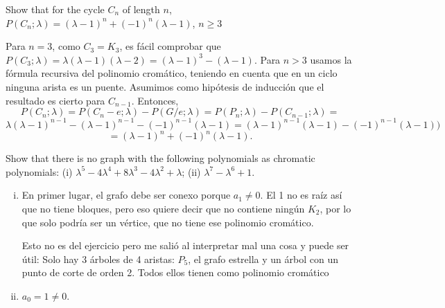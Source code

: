 \documentclass[twoside]{article}
\begin{document}
\newpage

\begin{ejercicio}{3.6}
Show that for the cycle $C_n$ of length $n$, $P(C_n; λ) = (λ − 1)^n + (−1)^n
(λ − 1)$, $n ≥ 3$
\end{ejercicio}
\begin{solucion}
Para $n=3$, como $C_3=K_3$, es fácil comprobar que $P(C_3;\lambda)=\lambda(\lambda-1)(\lambda-2)=(λ − 1)^3 −(λ − 1)$. Para $n>3$ usamos la fórmula recursiva del polinomio cromático, teniendo en cuenta que en un ciclo ninguna arista es un puente. Asumimos como hipótesis de inducción que el resultado es cierto para $C_{n-1}$. Entonces, 
\[
P(C_n;\lambda)=P(C_n-e;\lambda)-P(G/e;\lambda)=P(P_n;\lambda)-P(C_{n-1};\lambda)=
\]
\[
\lambda(\lambda-1)^{n-1}-(λ − 1)^{n-1} - (−1)^{n-1}(λ − 1)=(λ − 1)^{n-1}(\lambda-1)-(−1)^{n-1}(λ − 1))
\]
\[
=(λ − 1)^n+(−1)^n(λ − 1).
\]


%
\end{solucion}

\newpage

\begin{ejercicio}{3.7}
Show that there is no graph with the following polynomials as chromatic polynomials:
(i) $λ^5 − 4λ^4 + 8λ^3 − 4λ^2 + λ$; (ii) $λ^7 − λ^6 + 1$.
\end{ejercicio}
\begin{solucion}
\begin{enumerate}[(i)]
\item En primer lugar, el grafo debe ser conexo porque $a_1\neq 0$. El 1 no es raíz así que no tiene bloques, pero eso quiere decir que no contiene ningún $K_2$, por lo que solo podría ser un vértice, que no tiene ese polinomio cromático. 

Esto no es del ejercicio pero me salió al interpretar mal una cosa y puede ser útil: Solo hay 3 árboles de 4 aristas: $P_5$, el grafo estrella y un árbol con un punto de corte de orden 2. Todos ellos tienen como polinomio cromático
\item $a_0=1\neq 0$. 
\end{enumerate}
\end{solucion}
\end{document}
